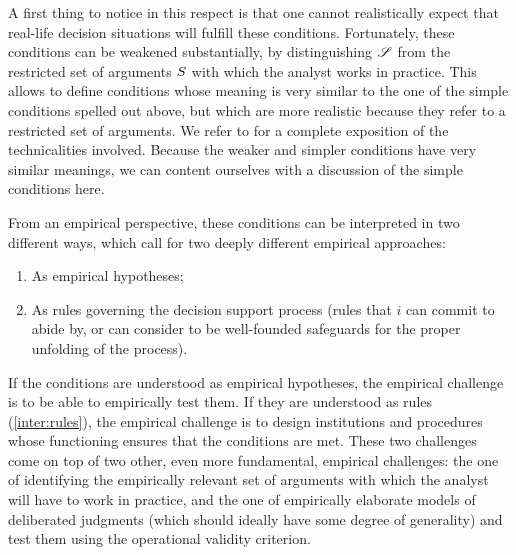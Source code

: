 \documentclass[version=3.21, pagesize, twoside=off, bibliography=totoc, DIV=calc, fontsize=12pt, a4paper, french, english]{scrartcl}
\begin{document}
{A first thing to notice in this respect is that one cannot realistically expect that real-life decision situations will fulfill these conditions. Fortunately, these conditions can be weakened substantially, by distinguishing $\mathscr{S}$ from the restricted set of arguments $S$ with which the analyst works in practice. This allows to define conditions whose meaning is very similar to the one of the simple conditions spelled out above, but which are more realistic because they refer to a restricted set of arguments. We refer to \citet{cailloux_formal_2019} for a complete exposition of the technicalities involved. Because the weaker and simpler conditions have very similar meanings, we can content ourselves with a discussion of the simple conditions here. 

From an empirical perspective, these conditions can be interpreted in two different ways, which call for two deeply different empirical approaches:
\begin{enumerate}[label=\emph{\roman*}, ref=\emph{\roman*}]
		\item \label{inter:empir} As empirical hypotheses;
	\item \label{inter:rules} As rules governing the decision support process (rules that $i$ can commit to abide by, or can consider to be well-founded safeguards for the proper unfolding of the process).
\end{enumerate}

If the conditions are understood as empirical hypotheses, the empirical challenge is to be able to empirically test them. If they are understood as rules (\ref{inter:rules}), the empirical challenge is to design institutions and procedures whose functioning ensures that the conditions are met. These two challenges come on top of two other, even more fundamental, empirical challenges: the one of identifying the empirically relevant set of arguments with which the analyst will have to work in practice, and the one of empirically elaborate models of deliberated judgments (which should ideally have some degree of generality)  and test them using the operational validity criterion.

}
\end{document}

